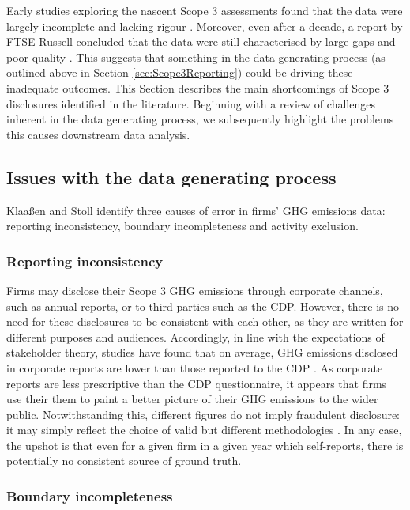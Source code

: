 \documentclass[12pt,twoside]{report}
\begin{document}
Early studies exploring the nascent Scope 3 assessments found that the data were largely incomplete and lacking rigour \cite{DownieStubbs2013}. Moreover, even after a decade, a report by FTSE-Russell concluded that the data were still characterised by large gaps and poor quality \cite{ftserussell2024}. This suggests that something in the data generating process (as outlined above in Section \ref{sec:Scope3Reporting}) could be driving these inadequate outcomes. This Section describes the main shortcomings of Scope 3 disclosures identified in the literature. Beginning with a review of challenges inherent in the data generating process, we subsequently highlight the problems this causes downstream data analysis. 

\subsection{Issues with the data generating process}\label{sec:DataGenIssues}

Klaaßen and Stoll \cite{klassenstoll2021} identify three causes of error in firms' GHG emissions data: reporting inconsistency, boundary incompleteness and activity exclusion. 

\subsubsection{Reporting inconsistency}

Firms may disclose their Scope 3 GHG emissions through corporate channels, such as annual reports, or to third parties such as the CDP. However, there is no need for these disclosures to be consistent with each other, as they are written for different purposes and audiences. Accordingly, in line with the expectations of stakeholder theory, studies have found that on average, GHG emissions disclosed in corporate reports are lower than those reported to the CDP \cite{depoers2016, klassenstoll2021}. As corporate reports are less prescriptive than the CDP questionnaire, it appears that firms use their them to paint a better picture of their GHG emissions to the wider public. Notwithstanding this, different figures do not imply fraudulent disclosure: it may simply reflect the choice of valid but different methodologies \cite{depoers2016}. In any case, the upshot is that even for a given firm in a given year which self-reports, there is potentially no consistent source of ground truth. 

\subsubsection{Boundary incompleteness}
\end{document}
